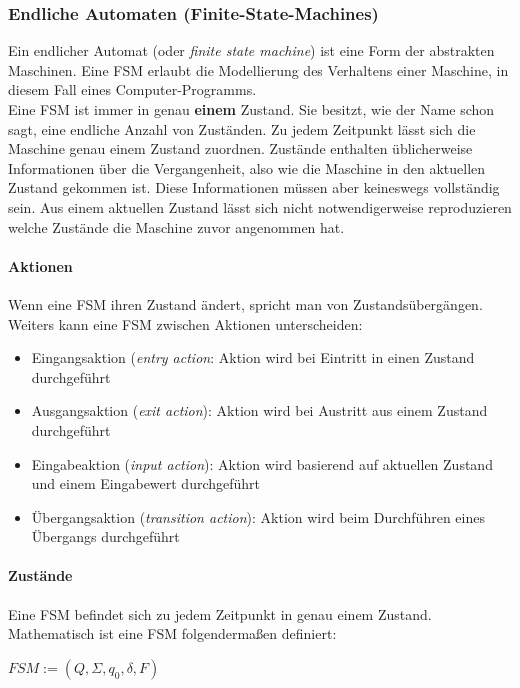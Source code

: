 \subsubsection{Endliche Automaten (Finite-State-Machines)}
\label{sec:fsm}
Ein endlicher Automat (oder \textit{finite state machine}) ist eine Form der abstrakten Maschinen. Eine FSM erlaubt die Modellierung des Verhaltens einer Maschine, in diesem Fall eines Computer-Programms.\cite{wagner_modeling_2006}\\
Eine FSM ist immer in genau \textbf{einem} Zustand. Sie besitzt, wie der Name schon sagt, eine endliche Anzahl von Zuständen. Zu jedem Zeitpunkt lässt sich die Maschine genau einem Zustand zuordnen. Zustände enthalten üblicherweise Informationen über die Vergangenheit, also wie die Maschine in den aktuellen Zustand gekommen ist. Diese Informationen müssen aber keineswegs vollständig sein. Aus einem aktuellen Zustand lässt sich nicht notwendigerweise reproduzieren welche Zustände die Maschine zuvor angenommen hat.\\

\paragraph{Aktionen}
Wenn eine FSM ihren Zustand ändert, spricht man von Zustandsübergängen. Weiters kann eine FSM zwischen Aktionen unterscheiden:
\begin{itemize}
\item Eingangsaktion (\textit{entry action}: Aktion wird bei Eintritt in einen Zustand durchgeführt
\item Ausgangsaktion (\textit{exit action}): Aktion wird bei Austritt aus einem Zustand durchgeführt
\item Eingabeaktion (\textit{input action}): Aktion wird basierend auf aktuellen Zustand und einem Eingabewert durchgeführt
\item Übergangsaktion (\textit{transition action}): Aktion wird beim Durchführen eines Übergangs durchgeführt
\end{itemize}

\paragraph{Zustände}
Eine FSM befindet sich zu jedem Zeitpunkt in genau einem Zustand. Mathematisch ist eine FSM folgendermaßen definiert: 

\begin{center}
$FSM := (Q, \Sigma, q_0, \delta, F)$
\end{center}

